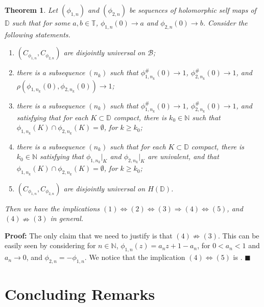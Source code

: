 \documentclass[12pt,a4paper]{amsart}
\theoremstyle{plain}
\newtheorem{theorem}{Theorem}[section]
\theoremstyle{definition}
\theoremstyle{remark}
\theoremstyle{fact}
\newenvironment{pf}
{\noindent\textbf{Proof:}}
{\hfill $\blacksquare$\par\medskip}
\begin{document}
    \begin{theorem}
        Let $(\phi_{1,n})$ and $(\phi_{2,n})$ be sequences of holomorphic self maps of $\mathbb{D}$ such that for some $a,b \in \mathbb{T}$, $\phi_{1,n}(0)\rightarrow a$ and $\phi_{2,n}(0)\rightarrow b$. Consider the following statements.
        \begin{enumerate}
            \item $(C_{\phi_{1,n}},C_{\phi_{2,n}})$ are disjointly universal on $\mathcal{B}$;

            \item there is a subsequence $(n_k)$ such that $\phi_{1,n_k}^\#(0)\rightarrow 1$, $\phi_{2,n_k}^\#(0)\rightarrow 1$, and\\ $\rho(\phi_{1,n_k}(0),\phi_{2,n_k}(0))\rightarrow 1$;

            \item there is a subsequence $(n_k)$ such that $\phi_{1,n_k}^\#(0)\rightarrow 1$, $\phi_{2,n_k}^\#(0)\rightarrow 1$, and satisfying that for each $K\subset \mathbb{D}$ compact, there is $k_0\in \mathbb{N}$ such that $\phi_{1,n_k}(K)\cap \phi_{2,n_k}(K)=\emptyset$, for $k\geq k_0$;

            \item there is a subsequence $(n_k)$ such that for each $K\subset \mathbb{D}$ compact, there is $k_0\in \mathbb{N}$ satisfying that $\phi_{1,n_k}|_K$ and $\phi_{2,n_k}|_K$ are univalent, and that $\phi_{1,n_k}(K)\cap \phi_{2,n_k}(K)=\emptyset$, for $k\geq k_0$;

            \item $(C_{\phi_{1,n}},C_{\phi_{2,n}})$ are disjointly universal on $H(\mathbb{D})$.
        \end{enumerate}
        Then we have the implications $(1)\Leftrightarrow (2)\Leftrightarrow (3)\Rightarrow (4)\Leftrightarrow (5)$, and $(4)\nRightarrow (3)$ in general.
    \end{theorem}

    \begin{pf}
        The only claim that we need to justify is that $(4)\nRightarrow (3)$. This can be easily seen by considering for $n\in \mathbb{N}$, $\phi_{1,n}(z)=a_nz+1-a_n$, for $0<a_n<1$ and $a_n\rightarrow 0$, and $\phi_{2,n}=-\phi_{1,n}$. We notice that the implication $(4)\Leftrightarrow (5)$ is \cite[Theorem 2.1]{BeMa}.
    \end{pf}

    \section{Concluding Remarks}
\end{document}
